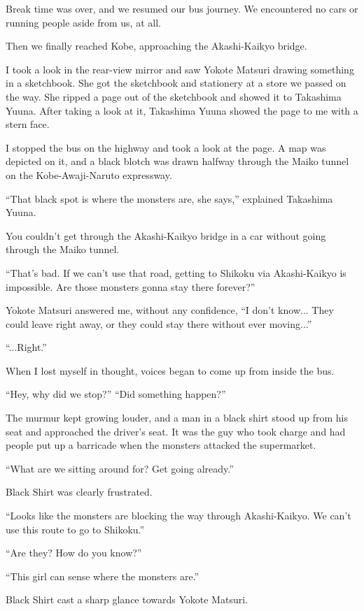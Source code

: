Break time was over, and we resumed our bus journey. We encountered no cars or running people aside from us, at all.

Then we finally reached Kobe, approaching the Akashi-Kaikyo bridge.

I took a look in the rear-view mirror and saw Yokote Matsuri drawing something in a sketchbook. She got the sketchbook and stationery at a store we passed on the way. She ripped a page out of the sketchbook and showed it to Takashima Yuuna. After taking a look at it, Takashima Yuuna showed the page to me with a stern face.

I stopped the bus on the highway and took a look at the page. A map was depicted on it, and a black blotch was drawn halfway through the Maiko tunnel on the Kobe-Awaji-Naruto expressway.

``That black spot is where the monsters are, she says,'' explained Takashima Yuuna.

You couldn't get through the Akashi-Kaikyo bridge in a car without going through the Maiko tunnel.

``That's bad. If we can't use that road, getting to Shikoku via Akashi-Kaikyo is impossible. Are those monsters gonna stay there forever?''

Yokote Matsuri answered me, without any confidence, ``I don't know... They could leave right away, or they could stay there without ever moving...''

``...Right.''

When I lost myself in thought, voices began to come up from inside the bus.

``Hey, why did we stop?''
``Did something happen?''

The murmur kept growing louder, and a man in a black shirt stood up from his seat and approached the driver's seat. It was the guy who took charge and had people put up a barricade when the monsters attacked the supermarket.

``What are we sitting around for? Get going already.''

Black Shirt was clearly frustrated.

``Looks like the monsters are blocking the way through Akashi-Kaikyo. We can't use this route to go to Shikoku.''

``Are they? How do you know?''

``This girl can sense where the monsters are.''

Black Shirt cast a sharp glance towards Yokote Matsuri.

